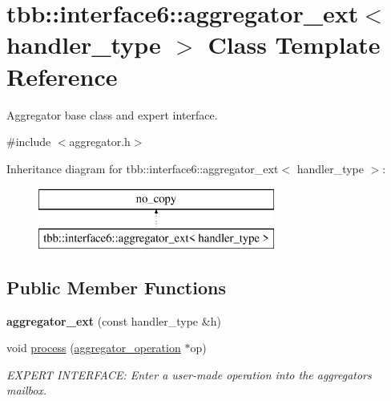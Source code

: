 \hypertarget{classtbb_1_1interface6_1_1aggregator__ext}{}\section{tbb\+:\+:interface6\+:\+:aggregator\+\_\+ext$<$ handler\+\_\+type $>$ Class Template Reference}
\label{classtbb_1_1interface6_1_1aggregator__ext}


Aggregator base class and expert interface.  




{\ttfamily \#include $<$aggregator.\+h$>$}

Inheritance diagram for tbb\+:\+:interface6\+:\+:aggregator\+\_\+ext$<$ handler\+\_\+type $>$\+:\begin{figure}[H]
\begin{center}
\leavevmode
\includegraphics[height=2.000000cm]{classtbb_1_1interface6_1_1aggregator__ext}
\end{center}
\end{figure}
\subsection*{Public Member Functions}
\begin{DoxyCompactItemize}
\item 
\hypertarget{classtbb_1_1interface6_1_1aggregator__ext_a8ae120a21264cc1ea0a9cfafaa0634e4}{}{\bfseries aggregator\+\_\+ext} (const handler\+\_\+type \&h)\label{classtbb_1_1interface6_1_1aggregator__ext_a8ae120a21264cc1ea0a9cfafaa0634e4}

\item 
void \hyperlink{classtbb_1_1interface6_1_1aggregator__ext_ae55b16ec6af204aa00d6a716fccec9f7}{process} (\hyperlink{classtbb_1_1interface6_1_1aggregator__operation}{aggregator\+\_\+operation} $\ast$op)
\begin{DoxyCompactList}\small\item\em E\+X\+P\+E\+R\+T I\+N\+T\+E\+R\+F\+A\+C\+E\+: Enter a user-\/made operation into the aggregator\textquotesingle{}s mailbox. \end{DoxyCompactList}\end{DoxyCompactItemize}
